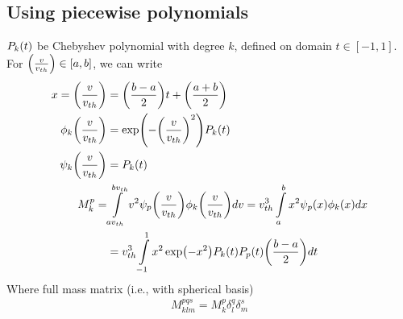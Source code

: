 \documentclass{article}[draft]
\begin{document}
\newpage
\subsection{Using piecewise polynomials}
$P_k\of{t}$ be Chebyshev polynomial with degree $k$, defined on domain $t\in[-1,1]$. For $\of{\frac{v}{v_{th}}} \in [a,b]$, we can write 
\begin{align*}
	x=\of{\frac{v}{v_{th}}} &= \of{\frac{b-a}{2}}t + \of{\frac{a+b}{2}} \\
	\phi_k\of{\frac{v}{v_{th}}} &= \exp\of{-\of{\frac{v}{v_{th}}}^2} P_k(t) \\
	\psi_k\of{\frac{v}{v_{th}}} &= P_k(t) \\
	M^p_k = &\myint_{av_{th}}^{b v_{th}} v^2 \psi_p\of{\frac{v}{v_{th}}} \phi_k\of{\frac{v}{v_{th}}} dv = v_{th}^3  \myint_{a}^{b} x^2 \psi_p\of{x} \phi_k\of{x}dx\\
	&=v_{th}^3 \myint_{-1}^{1} x^2 \exp\of{-x^2}  P_k(t) P_p(t) \of{\frac{b-a}{2}} dt
\end{align*} Where full mass matrix (i.e., with spherical basis)
\begin{align*}
	M^{pqs}_{klm} = M^{p}_k \delta^{q}_{l} \delta^{s}_{m}
\end{align*}
\end{document}
